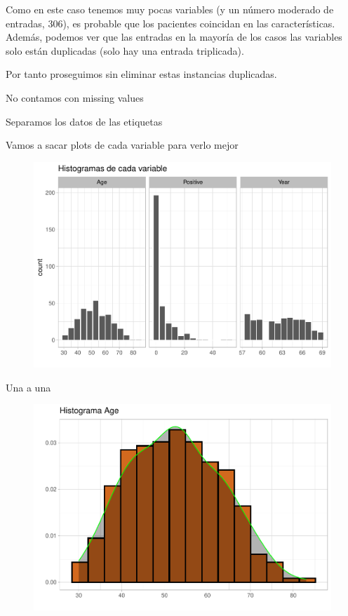 Como en este caso tenemos muy pocas variables (y un número moderado de
entradas, 306), es probable que los pacientes coincidan en las
características. Además, podemos ver que las entradas en la mayoría de
los casos las variables solo están duplicadas (solo hay una entrada
triplicada).

Por tanto proseguimos sin eliminar estas instancias duplicadas.



No contamos con missing values

Separamos los datos de las etiquetas

Vamos a sacar plots de cada variable para verlo mejor

\begin{figure}[H]\includegraphics[width=.9\linewidth]{img/EDA2_files/figure-latex/unnamed-chunk-9-1} \end{figure}

Una a una

\begin{figure}[H]\includegraphics[width=.9\linewidth]{img/EDA2_files/figure-latex/unnamed-chunk-10-1} \end{figure}


